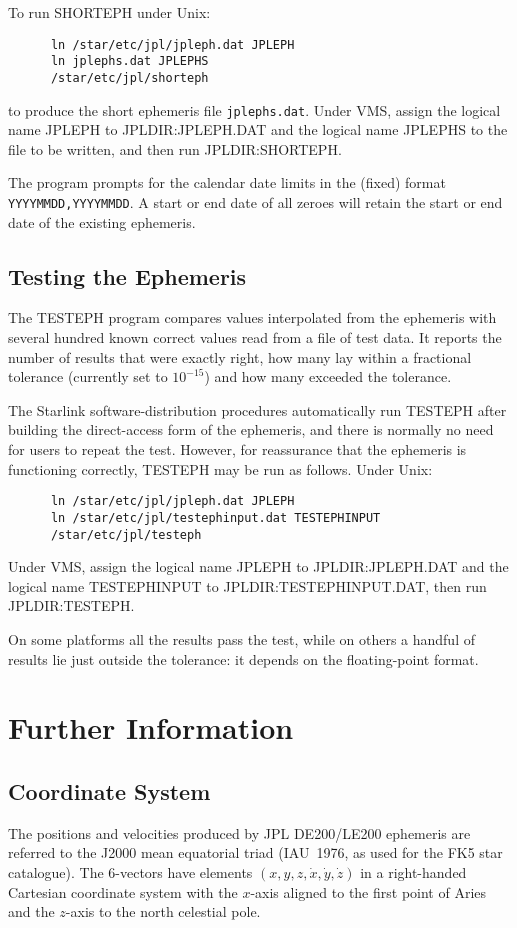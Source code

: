 To run SHORTEPH under Unix:
\begin{verbatim}
      ln /star/etc/jpl/jpleph.dat JPLEPH
      ln jplephs.dat JPLEPHS
      /star/etc/jpl/shorteph
\end{verbatim}
to produce the short ephemeris file \verb|jplephs.dat|.
Under VMS, assign the logical name JPLEPH to
JPLDIR:JPLEPH.DAT and the logical name JPLEPHS to the file to be
written, and then run JPLDIR:SHORTEPH.

The program prompts for the calendar date limits in the
(fixed) format \verb|YYYYMMDD,YYYYMMDD|.  A start or end
date of all zeroes will retain the start or end date
of the existing ephemeris.
                                                                        
\subsection{Testing the Ephemeris}
The TESTEPH program compares values interpolated from
the ephemeris with several hundred known correct values read from a file
of test data.  It reports the number of results that were
exactly right, how many lay within a fractional
tolerance (currently set to $10^{-15}$)
and how many exceeded the tolerance.

The Starlink software-distribution
procedures automatically run TESTEPH after building the
direct-access form of the ephemeris, and there is
normally no need for users to repeat the test.  However, for
reassurance that the ephemeris is functioning correctly,
TESTEPH may be run as follows.  Under Unix:
\begin{verbatim}
      ln /star/etc/jpl/jpleph.dat JPLEPH
      ln /star/etc/jpl/testephinput.dat TESTEPHINPUT
      /star/etc/jpl/testeph
\end{verbatim}
Under VMS, assign the logical name
JPLEPH to JPLDIR:JPLEPH.DAT
and the logical name TESTEPHINPUT to JPLDIR:TESTEPHINPUT.DAT,
then run JPLDIR:TESTEPH.

On some platforms
all the results pass the test, while on others a handful of
results lie just outside the tolerance:  it depends on
the floating-point format.

\section{Further Information}

\subsection{Coordinate System}
The positions and velocities produced by JPL DE200/LE200 ephemeris
are referred to the J2000 mean equatorial triad (IAU~1976,
as used for the FK5 star catalogue).
The 6-vectors have elements $( x, y, z, \dot{x}, \dot{y}, \dot{z} )$
in a
right-handed Cartesian coordinate system with the $x$-axis aligned to the first
point of Aries and the $z$-axis to the north celestial pole.

